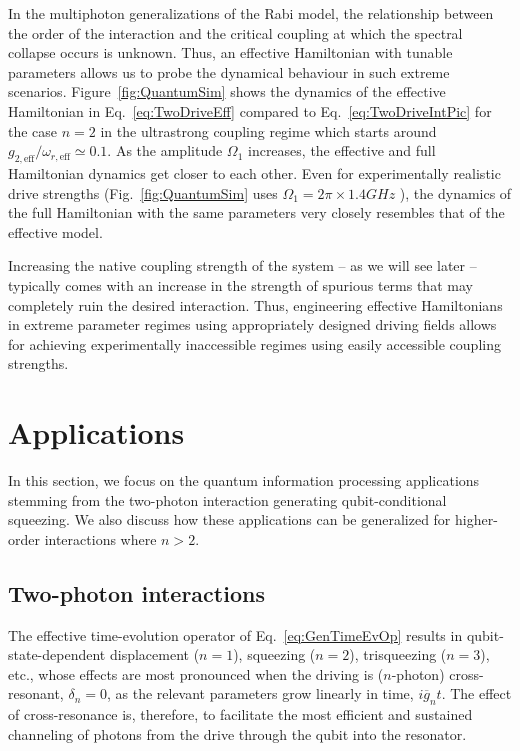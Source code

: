In the multiphoton generalizations of the Rabi model, {the relationship between the order of the interaction and the critical coupling at which the spectral collapse occurs is unknown}. Thus, an effective Hamiltonian with tunable parameters allows us to probe the dynamical behaviour in such extreme scenarios. Figure~\ref{fig:QuantumSim} shows the dynamics of the effective Hamiltonian in Eq.~\eqref{eq:TwoDriveEff} compared to Eq.~\eqref{eq:TwoDriveIntPic} for the case $n=2$ in the ultrastrong coupling regime { which starts around} $g_{2,\text{eff}}/\omega_{r,\text{eff}}\simeq 0.1$. As the amplitude $\Omega_1$ increases, the effective and full Hamiltonian dynamics get closer to each other. Even for experimentally realistic drive strengths (Fig.~\ref{fig:QuantumSim} uses $\Omega_1=2\pi\times 1.4 GHz $ ), the dynamics of the full Hamiltonian with the same parameters very closely resembles that of the effective model. 

Increasing the native coupling strength of the system -- as we will see later -- typically comes with an increase in the strength of spurious terms that may completely ruin the desired interaction. Thus, engineering effective Hamiltonians in extreme parameter regimes using appropriately designed driving fields allows for achieving experimentally inaccessible regimes using easily accessible coupling strengths.
\\



\section{Applications\label{sec:TwoPhApp}}

In this section, we focus on the quantum information processing applications stemming from the two-photon interaction generating qubit-conditional squeezing. We also discuss how these applications can be generalized for higher-order interactions where $n>2$.
\\

\subsection{Two-photon interactions}
The effective time-evolution operator of Eq.~\eqref{eq:GenTimeEvOp} results in qubit-state-dependent displacement ($n=1$), squeezing ($n=2$), trisqueezing ($n=3$), etc., whose effects are most pronounced when the driving is ($n$-photon) cross-resonant, $\delta_n=0$, as the relevant parameters grow linearly in time, $i\overline{g}_n t$. The effect of cross-resonance is, therefore, to facilitate the most efficient and sustained channeling of photons from the drive through the qubit into the resonator.

